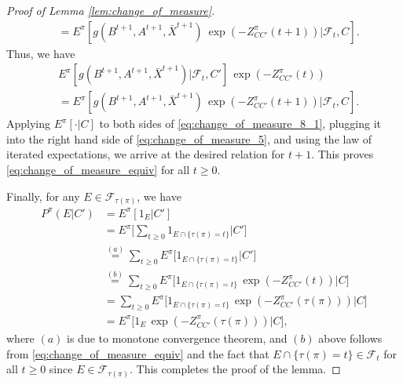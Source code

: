 \begin{proof}[Proof of Lemma \ref{lem:change_of_measure}]
\begin{align}
		&=E^\pi[g(B^{t+1},A^{t+1},\bar{X}^{t+1})~\exp(-Z^\pi_{CC'}(t+1))|\mathcal{F}_t, C].\label{eq:change_of_measure_8}
	\end{align}\endgroup
	Thus, we have
	\begin{align}
		&E^\pi[g(B^{t+1},A^{t+1},\bar{X}^{t+1})|\mathcal{F}_t,C']\,\exp(-Z^\pi_{CC'}(t))\nonumber\\
		&=E^\pi[g(B^{t+1},A^{t+1},\bar{X}^{t+1})\,\exp(-Z^\pi_{CC'}(t+1))|\mathcal{F}_t, C].
		\label{eq:change_of_measure_8_1}
	\end{align}
	Applying $E^\pi[\cdot|C]$ to both sides of \eqref{eq:change_of_measure_8_1}, plugging it into the right hand side of \eqref{eq:change_of_measure_5}, and using the law of iterated expectations, we arrive at the desired relation for $t+1$. This proves \eqref{eq:change_of_measure_equiv} for all $t\geq 0$.
	
	Finally, for any $E\in\mathcal{F}_{\tau(\pi)}$, we have
	\begingroup \allowdisplaybreaks\begin{align}
		P^\pi(E|C')&=E^\pi[1_{E}|C']\nonumber\\
		&=E^\pi\bigg[\sum\limits_{t\geq 0} 1_{E\cap \{\tau(\pi)= t\}}\bigg|C'\bigg]\nonumber\\
		&\stackrel{(a)}{=}\sum\limits_{t\geq 0}E^\pi\bigg[1_{E\cap \{\tau(\pi)= t\}}\bigg|C']\nonumber\\
		&\stackrel{(b)}{=}\sum\limits_{t\geq 0}E^\pi\bigg[1_{E\cap \{\tau(\pi)= t\}}\,\exp(-Z^\pi_{CC'}(t))\bigg|C]\nonumber\\
		&=\sum\limits_{t\geq 0}E^\pi\bigg[1_{E\cap \{\tau(\pi)= t\}}\,\exp(-Z^\pi_{CC'}(\tau(\pi)))\bigg|C]\nonumber\\
		&=E^\pi\bigg[1_{E}\,\exp(-Z^\pi_{CC'}(\tau(\pi)))\bigg|C],\label{eq:change_of_measure_9}
	\end{align}\endgroup
	where $(a)$ is due to monotone convergence theorem, and $(b)$ above follows from \eqref{eq:change_of_measure_equiv} and the fact that $E\cap \{\tau(\pi)=t\}\in\mathcal{F}_t$ for all $t\geq 0$ since $E\in\mathcal{F}_{\tau(\pi)}$. This completes the proof of the lemma.
\end{proof}

